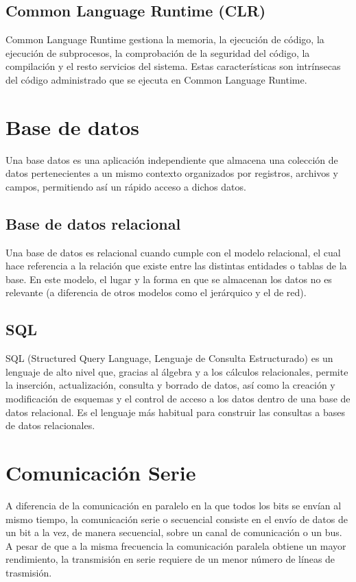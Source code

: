 \subsection{Common Language Runtime (CLR)}

Common Language Runtime gestiona la memoria, la ejecución de código, la ejecución de subprocesos, la comprobación de la seguridad del código, la compilación y el resto servicios del sistema. Estas características son intrínsecas del código administrado que se ejecuta en Common Language Runtime.

\section{Base de datos}

Una base datos es una aplicación independiente que almacena una colección de datos pertenecientes a un mismo contexto organizados por registros, archivos y campos, permitiendo así un rápido acceso a dichos datos.

\subsection{Base de datos relacional}

Una base de datos es relacional cuando cumple con el modelo relacional, el cual hace referencia a la relación que existe entre las distintas entidades o tablas de la base. En este modelo, el lugar y la forma en que se almacenan los datos no es relevante (a diferencia de otros modelos como el jerárquico y el de red).

\subsection{SQL}

SQL (Structured Query Language, Lenguaje de Consulta Estructurado) es un lenguaje de alto nivel que, gracias al álgebra y a los cálculos relacionales, permite la inserción, actualización, consulta y borrado de datos, así como la creación y modificación de esquemas y el control de acceso a los datos dentro de una base de datos relacional. Es el lenguaje más habitual para construir las consultas a bases de datos relacionales.

\section{Comunicación Serie}

A diferencia de la comunicación en paralelo en la que todos los bits se envían al mismo tiempo, la comunicación serie o secuencial consiste en el envío de datos de un bit a la vez, de manera secuencial, sobre un canal de comunicación o un bus. A pesar de que a la misma frecuencia la comunicación paralela obtiene un mayor rendimiento, la transmisión en serie requiere de un menor número de líneas de trasmisión.

